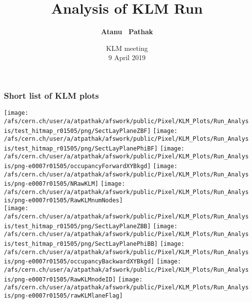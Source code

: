 \documentclass{beamer}
\title{Analysis of KLM Run} %
\author{{\bf Atanu ~Pathak} \\}
\institute{\begin{minipage}{0.5\textwidth}\centering
    \texttt{[image: /afs/cern.ch/user/s/swaban/public/university-of-louisville-logo.png]}
    \end{minipage}}
\date {{KLM meeting}\\9 April 2019}
\begin{document}
    \begin{frame}
    \titlepage
    \end{frame}
    \begin{frame}
    \frametitle{Short list of KLM plots}
    \vspace*{.05cm}
    \begin{center}
    \begin{normalsize}
    \vspace*{-.2cm}
    \begin{center}
    \texttt{[image: /afs/cern.ch/user/a/atpathak/afswork/public/Pixel/KLM\_Plots/Run\_Analysis/test\_hitmap\_r01505/png/SectLayPlaneZBF]}
    \texttt{[image: /afs/cern.ch/user/a/atpathak/afswork/public/Pixel/KLM\_Plots/Run\_Analysis/test\_hitmap\_r01505/png/SectLayPlanePhiBF]}
    \texttt{[image: /afs/cern.ch/user/a/atpathak/afswork/public/Pixel/KLM\_Plots/Run\_Analysis/png-e0007r01505/occupancyForwardXYBkgd]}
    \texttt{[image: /afs/cern.ch/user/a/atpathak/afswork/public/Pixel/KLM\_Plots/Run\_Analysis/png-e0007r01505/NRawKLM]}
    \texttt{[image: /afs/cern.ch/user/a/atpathak/afswork/public/Pixel/KLM\_Plots/Run\_Analysis/png-e0007r01505/RawKLMnumNodes]}\\
    \texttt{[image: /afs/cern.ch/user/a/atpathak/afswork/public/Pixel/KLM\_Plots/Run\_Analysis/test\_hitmap\_r01505/png/SectLayPlaneZBB]}
    \texttt{[image: /afs/cern.ch/user/a/atpathak/afswork/public/Pixel/KLM\_Plots/Run\_Analysis/test\_hitmap\_r01505/png/SectLayPlanePhiBB]}
    \texttt{[image: /afs/cern.ch/user/a/atpathak/afswork/public/Pixel/KLM\_Plots/Run\_Analysis/png-e0007r01505/occupancyBackwardXYBkgd]}
    \texttt{[image: /afs/cern.ch/user/a/atpathak/afswork/public/Pixel/KLM\_Plots/Run\_Analysis/png-e0007r01505/RawKLMnodeID]}
    \texttt{[image: /afs/cern.ch/user/a/atpathak/afswork/public/Pixel/KLM\_Plots/Run\_Analysis/png-e0007r01505/rawKLMlaneFlag]} \\
    
    \end{center}
    \end{normalsize}
    \end{center}
    \end{frame}
\end{document}
